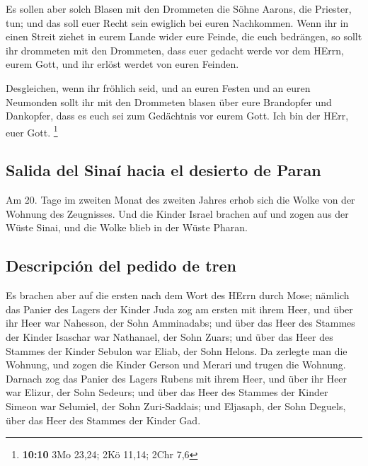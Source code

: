  Es sollen aber solch Blasen mit den Drommeten die Söhne
Aarons, die Priester, tun; und das soll euer Recht sein ewiglich bei
euren Nachkommen.  Wenn ihr in einen Streit ziehet in
eurem Lande wider eure Feinde, die euch bedrängen, so sollt ihr
drommeten mit den Drommeten, dass euer gedacht werde vor dem HErrn,
eurem Gott, und ihr erlöst werdet von euren Feinden.

 Desgleichen, wenn ihr fröhlich seid, und an euren Festen
und an euren Neumonden sollt ihr mit den Drommeten blasen über eure
Brandopfer und Dankopfer, dass es euch sei zum Gedächtnis vor eurem
Gott. Ich bin der HErr, euer Gott. \footnote{\textbf{10:10} 3Mo 23,24;
  2Kö 11,14; 2Chr 7,6}

\hypertarget{salida-del-sinauxed-hacia-el-desierto-de-paran}{%
\subsection{Salida del Sinaí hacia el desierto de
Paran}\label{salida-del-sinauxed-hacia-el-desierto-de-paran}}

 Am 20. Tage im zweiten Monat des zweiten Jahres erhob
sich die Wolke von der Wohnung des Zeugnisses.  Und die
Kinder Israel brachen auf und zogen aus der Wüste Sinai, und die Wolke
blieb in der Wüste Pharan.

\hypertarget{descripciuxf3n-del-pedido-de-tren}{%
\subsection{Descripción del pedido de
tren}\label{descripciuxf3n-del-pedido-de-tren}}

 Es brachen aber auf die ersten nach dem Wort des HErrn
durch Mose;  nämlich das Panier des Lagers der Kinder
Juda zog am ersten mit ihrem Heer, und über ihr Heer war Nahesson, der
Sohn Amminadabs;  und über das Heer des Stammes der
Kinder Isaschar war Nathanael, der Sohn Zuars;  und über
das Heer des Stammes der Kinder Sebulon war Eliab, der Sohn Helons.
 Da zerlegte man die Wohnung, und zogen die Kinder Gerson
und Merari und trugen die Wohnung.  Darnach zog das
Panier des Lagers Rubens mit ihrem Heer, und über ihr Heer war Elizur,
der Sohn Sedeurs;  und über das Heer des Stammes der
Kinder Simeon war Selumiel, der Sohn Zuri-Saddais;  und
Eljasaph, der Sohn Deguels, über das Heer des Stammes der Kinder Gad.

